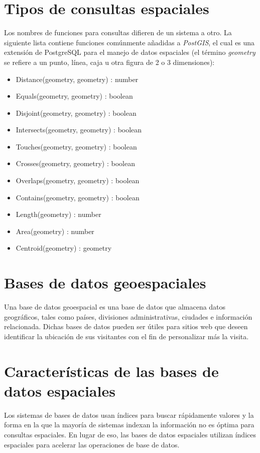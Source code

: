 \documentclass{article}
\begin{document}
\section{Tipos de consultas espaciales}
Los nombres de funciones para consultas difieren de un sistema a otro. La siguiente lista contiene funciones com\'unmente a\~nadidas a \emph{PostGIS}, el cual es una extensi\'on de PostgreSQL para el manejo de datos espaciales (el t\'ermino \emph{geometry} se refiere a un punto, l\'inea, caja u otra figura de 2 o 3 dimensiones):

\begin{itemize}
  \item Distance(geometry, geometry) : number
  \item Equals(geometry, geometry) : boolean
  \item Disjoint(geometry, geometry) : boolean
  \item Intersects(geometry, geometry) : boolean
  \item Touches(geometry, geometry) : boolean
  \item Crosses(geometry, geometry) : boolean
  \item Overlaps(geometry, geometry) : boolean
  \item Contains(geometry, geometry) : boolean
  \item Length(geometry) : number
  \item Area(geometry) : number
  \item Centroid(geometry) : geometry
\end{itemize}

\section{Bases de datos geoespaciales}
Una base de datos geoespacial es una base de datos que almacena datos geogr\'aficos, tales como pa\'ises, divisiones administrativas, ciudades e informaci\'on relacionada. Dichas bases de datos pueden ser \'utiles para sitios web que deseen identificar la ubicaci\'on de sus visitantes con el fin de personalizar m\'as la visita.

\section{Caracter\'isticas de las bases de datos espaciales}
Los sistemas de bases de datos usan \'indices para buscar r\'apidamente valores y la forma en la que la mayor\'ia de sistemas indexan la informaci\'on no es \'optima para consultas espaciales. En lugar de eso, las bases de datos espaciales utilizan \'indices espaciales para acelerar las operaciones de base de datos.
\end{document}
